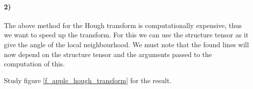 \documentclass[a4paper, 10pt, final]{article}
\begin{document}
\paragraph{2)}
The above method for the Hough transform is computationally expensive,
thus we want to speed up the transform. For this we can use the
structure tensor as it give the angle of the local neighbourhood. We
must note that the found lines will now depend on the structure tensor
and the arguments passed to the computation of this.

Study figure \ref{f_apple_hough_transform} for the result.

\begin{figure}[!h]
    \centering
    \hspace{1em}
    \\

\end{figure}
\end{document}
